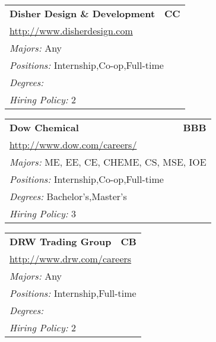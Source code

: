 \documentclass[twoside]{article}
\begin{document}
\begin{center}
\begin{multicols}{3}
\begin{FlushLeft}
\begin{minipage}{\columnwidth}
\end{minipage}
 
\begin{minipage}{\columnwidth}\begin{tabularx}{.95\columnwidth}{Xr}
                 {\Large\bf Disher Design \& Development} & {\Large\bf CC}\\
    \multicolumn{2}{p{.95\columnwidth}}{\url{http://www.disherdesign.com}}\\
    \multicolumn{2}{p{.95\columnwidth}}{\emph{Majors:} Any}\\
    \multicolumn{2}{p{.95\columnwidth}}{\emph{Positions:} Internship,Co-op,Full-time}\\
    \multicolumn{2}{p{.95\columnwidth}}{\emph{Degrees:} }\\
    \multicolumn{2}{p{.95\columnwidth}}{\emph{Hiring Policy:} 2}\\
    \end{tabularx}
    
\end{minipage}
 
\begin{minipage}{\columnwidth}\begin{tabularx}{.95\columnwidth}{Xr}
                 {\Large\bf Dow Chemical} & {\Large\bf BBB}\\
    \multicolumn{2}{p{.95\columnwidth}}{\url{http://www.dow.com/careers/}}\\
    \multicolumn{2}{p{.95\columnwidth}}{\emph{Majors:} ME, EE, CE, CHEME, CS, MSE, IOE}\\
    \multicolumn{2}{p{.95\columnwidth}}{\emph{Positions:} Internship,Co-op,Full-time}\\
    \multicolumn{2}{p{.95\columnwidth}}{\emph{Degrees:} Bachelor's,Master's}\\
    \multicolumn{2}{p{.95\columnwidth}}{\emph{Hiring Policy:} 3}\\
    \end{tabularx}
    
\end{minipage}
 
\begin{minipage}{\columnwidth}\begin{tabularx}{.95\columnwidth}{Xr}
                 {\Large\bf DRW Trading Group} & {\Large\bf CB}\\
    \multicolumn{2}{p{.95\columnwidth}}{\url{http://www.drw.com/careers}}\\
    \multicolumn{2}{p{.95\columnwidth}}{\emph{Majors:} Any}\\
    \multicolumn{2}{p{.95\columnwidth}}{\emph{Positions:} Internship,Full-time}\\
    \multicolumn{2}{p{.95\columnwidth}}{\emph{Degrees:} }\\
    \multicolumn{2}{p{.95\columnwidth}}{\emph{Hiring Policy:} 2}\\
    \end{tabularx}
    

\end{minipage}
\end{FlushLeft}
\end{multicols}
\end{center}
\end{document}
